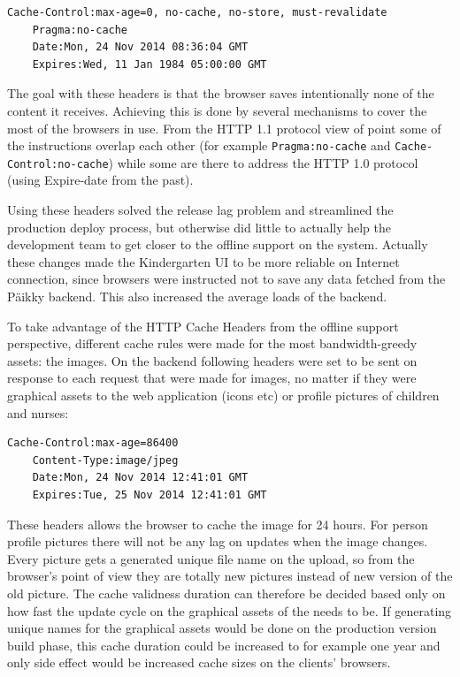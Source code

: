 \begin{lstlisting}[caption={Päikky HTTP Cache Headers},label={lst:cacheheader-1}]
    Cache-Control:max-age=0, no-cache, no-store, must-revalidate
    Pragma:no-cache
    Date:Mon, 24 Nov 2014 08:36:04 GMT
    Expires:Wed, 11 Jan 1984 05:00:00 GMT
\end{lstlisting}

The goal with these headers is that the browser saves intentionally none of the content it receives. Achieving this is done by several mechanisms to cover the most of the browsers in use. From the HTTP 1.1 protocol view of point some of the instructions overlap each other (for example \texttt{Pragma:no-cache} and \texttt{Cache-Control:no-cache}) while some are there to address the HTTP 1.0 protocol (using Expire-date from the past). \cite{fielding_et_al_hypertext_????}

Using these headers solved the release lag problem and streamlined the production deploy process, but otherwise did little to actually help the development team to get closer to the offline support on the system. Actually these changes made the Kindergarten UI to be more reliable on Internet connection, since browsers were instructed not to save any data fetched from the Päikky backend. This also increased the average loads of the backend.

To take advantage of the HTTP Cache Headers from the offline support perspective, different cache rules were made for the most bandwidth-greedy assets: the images. On the backend following headers were set to be sent on response to each request that were made for images, no matter if they were graphical assets to the web application (icons etc) or profile pictures of children and nurses:

\begin{lstlisting}[caption=Päikky HTTP Cache Headers for images]
    Cache-Control:max-age=86400
    Content-Type:image/jpeg
    Date:Mon, 24 Nov 2014 12:41:01 GMT
    Expires:Tue, 25 Nov 2014 12:41:01 GMT
\end{lstlisting}

These headers allows the browser to cache the image for 24 hours. For person profile pictures there will not be any lag on updates when the image changes. Every picture gets a generated unique file name on the upload, so from the browser's point of view they are totally new pictures instead of new version of the old picture. The cache validness duration can therefore be decided based only on how fast the update cycle on the graphical assets of the needs to be. If generating unique names for the graphical assets would be done on the production version build phase, this cache duration could be increased to for example one year and only side effect would be increased cache sizes on the clients' browsers.

